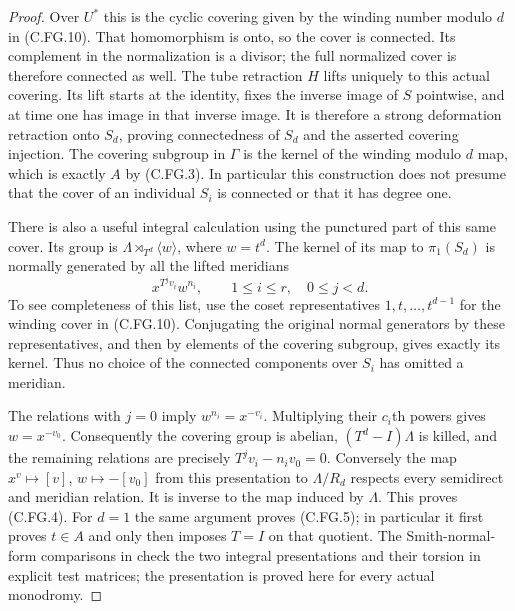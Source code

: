 \begin{proof}
Over $U^*$ this is the cyclic covering given by the winding number
modulo $d$ in (C.FG.10). That homomorphism is onto, so the cover
is connected. Its complement in the normalization is a divisor;
the full normalized cover is therefore connected as well.
The tube retraction $H$ lifts uniquely to this actual covering.
Its lift starts at the identity, fixes the inverse image of $S$
pointwise, and at time one has image in that inverse image. It is
therefore a strong deformation retraction onto $S_d$, proving
connectedness of $S_d$ and the asserted covering injection.
The covering subgroup in $\Gamma$ is the kernel of the winding
modulo $d$ map, which is exactly $A$ by (C.FG.3). In particular
this construction does not presume that the cover of an individual
$S_i$ is connected or that it has degree one.

There is also a useful integral calculation using the punctured
part of this same cover. Its group is
$\Lambda\rtimes_{T^d}\langle w\rangle$, where $w=t^d$.
The kernel of its map to $\pi_1(S_d)$ is normally generated by
all the lifted meridians
\[
                x^{T^jv_i}w^{n_i},
                  \qquad 1\le i\le r,\quad0\le j<d .  \tag{C.FG.13}
\]
To see completeness of this list, use the coset representatives
$1,t,\ldots,t^{d-1}$ for the winding cover in (C.FG.10).
Conjugating the original normal generators by these representatives,
and then by elements of the covering subgroup, gives exactly its
kernel. Thus no choice of the connected components over $S_i$
has omitted a meridian.

The relations with $j=0$ imply $w^{n_i}=x^{-v_i}$.
Multiplying their $c_i$th powers gives $w=x^{-v_0}$. Consequently
the covering group is abelian, $(T^d-I)\Lambda$ is killed, and
the remaining relations are precisely
$T^jv_i-n_iv_0=0$. Conversely the map $x^v\mapsto[v]$,
$w\mapsto-[v_0]$ from this presentation to $\Lambda/R_d$
respects every semidirect and meridian relation. It is inverse to
the map induced by $\Lambda$. This proves (C.FG.4). For $d=1$
the same argument proves (C.FG.5); in particular it first proves
$t\in A$ and only then imposes $T=I$ on that quotient.
The Smith-normal-form comparisons in
 check the two integral
presentations and their torsion in explicit test matrices; the
presentation is proved here for every actual monodromy.


\end{proof}
